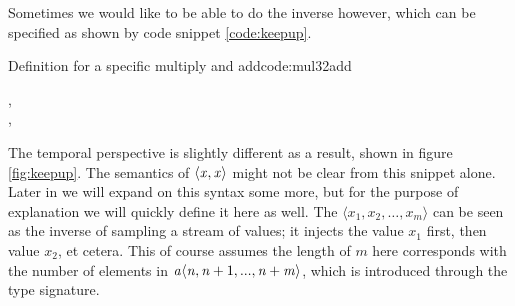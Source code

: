 Sometimes we would like to be able to do the inverse however, which can be specified as shown by code snippet \ref{code:keepup}.
\begin{texexptitled}{Definition for a specific multiply and add}{code:mul32add}
\begin{hscode}\SaveRestoreHook
{}%
%
\>[B]{}\mathbin{::}\langle{}\mathbin{*}\rangle\to {}\langle{},\mathbin{+}\rangle{}\<[E]%
\\
\>[B]{}\;\mathrel{=}\langle{},\rangle{}\<[E]%
\ColumnHook
\end{hscode}\resethooks
\end{texexptitled}
The temporal perspective is slightly different as a result, shown in figure \ref{fig:keepup}.
The semantics of \ensuremath{\langle\Varid{x},\Varid{x}\rangle} might not be clear from this snippet alone. 
Later in  we will expand on this syntax some more, but for the purpose of explanation we will quickly define it here as well.
The $\langle x_1,x_2,\ldots,x_m \rangle$ can be seen as the inverse of sampling a stream of values; it injects the value $x_1$ first, then value $x_2$, et cetera. 
This of course assumes the length of $m$ here corresponds with the number of elements in \ensuremath{\Varid{a}\langle\Varid{n},\Varid{n}\mathbin{+}\mathrm{1},\mathbin{...},\Varid{n}\mathbin{+}\Varid{m}\rangle}, which is introduced through the type signature. 
\begin{figure}[H]
\centering
{}
\end{figure}

